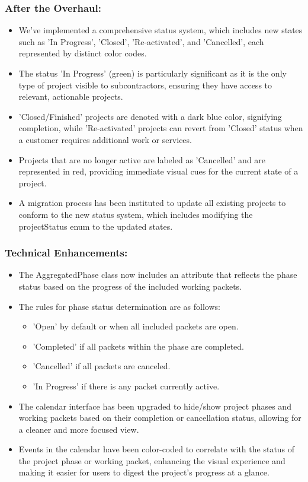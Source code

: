 \subsubsection{After the Overhaul:}
\begin{itemize}
    \item We've implemented a comprehensive status system, which includes new states such as 'In Progress', 'Closed', 'Re-activated', and 'Cancelled', each represented by distinct color codes.
    \item The status 'In Progress' (green) is particularly significant as it is the only type of project visible to subcontractors, ensuring they have access to relevant, actionable projects.
    \item 'Closed/Finished' projects are denoted with a dark blue color, signifying completion, while 'Re-activated' projects can revert from 'Closed' status when a customer requires additional work or services.
    \item Projects that are no longer active are labeled as 'Cancelled' and are represented in red, providing immediate visual cues for the current state of a project.
    \item A migration process has been instituted to update all existing projects to conform to the new status system, which includes modifying the projectStatus enum to the updated states.
\end{itemize}



\subsubsection*{Technical Enhancements:}
\begin{itemize}
    \item The AggregatedPhase class now includes an attribute that reflects the phase status based on the progress of the included working packets.
    \item The rules for phase status determination are as follows:
        \begin{itemize}
            \item 'Open' by default or when all included packets are open.
            \item 'Completed' if all packets within the phase are completed.
            \item 'Cancelled' if all packets are canceled.
            \item 'In Progress' if there is any packet currently active.
        \end{itemize}
    \item The calendar interface has been upgraded to hide/show project phases and working packets based on their completion or cancellation status, allowing for a cleaner and more focused view.
    \item Events in the calendar have been color-coded to correlate with the status of the project phase or working packet, enhancing the visual experience and making it easier for users to digest the project's progress at a glance.
\end{itemize}

